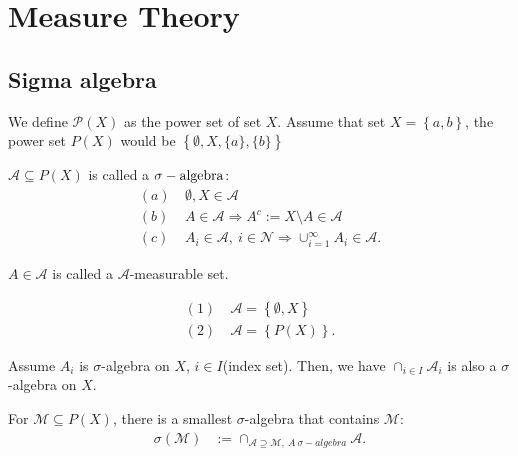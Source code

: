 \documentclass[../../note.tex]{subfiles}
\begin{document}
\chapter{Measure Theory}
\section{Sigma algebra}
\begin{example}
    We define $\mathcal{P}(X)$ as the power set of set $X$. Assume that set $X = \left\{a,b\right\}$, the power set $P(X)$ would be $\left\{\emptyset, X, \{a\}, \{b\}\right\}$
\end{example}
\begin{definition}
    $\mathcal{A} \subseteq P(X)$ is called a $\sigma-{\rm algebra}$:
    \begin{align}
        (a)~& \emptyset, X \in \mathcal{A} \\
        (b)~& A \in \mathcal{A} \Longrightarrow A^c:= X \text{\textbackslash} A \in \mathcal{A} \\
        (c)~& A_i \in \mathcal{A},~i \in \mathcal{N}\Longrightarrow \cup_{i=1}^{\infty} A_i \in \mathcal{A}.
    \end{align}
\end{definition}

\begin{definition}
    $A \in \mathcal{A}$ is called a $\mathcal{A}$-measurable set.
\end{definition}

\begin{example}
    \begin{align}
        (1)~&\mathcal{A} = \left\{\emptyset, X \right\} \\
        (2)~&\mathcal{A} = \left\{P(X)\right\}.
    \end{align}
\end{example}

\begin{lemma}
    Assume $A_i$ is $\sigma$-algebra on $X$, $i\in I$(index set). Then, we have $\cap_{i \in I} \mathcal{A}_i$ is also a $\sigma$-algebra on $X$.
\end{lemma}

\begin{definition}
    For $\mathcal{M} \subseteq P(X)$, there is a smallest $\sigma$-algebra that contains $\mathcal{M}$:
    \begin{align}
        \sigma(\mathcal{M})
        &:= \cap_{\mathcal{A}\supseteq \mathcal{M},~A~\sigma-algebra} \mathcal{A}.
    \end{align}
\end{definition}
\end{document}

